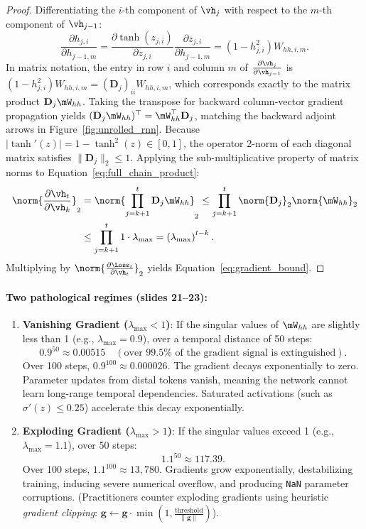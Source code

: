 \documentclass[../../main.tex]{subfiles}
\begin{document}
\begin{proof}
Differentiating the $i$-th component of $\vh_j$ with respect to the $m$-th component of $\vh_{j-1}$:
\[
\frac{\partial h_{j, i}}{\partial h_{j-1, m}} = \frac{\partial \tanh(z_{j, i})}{\partial z_{j, i}} \frac{\partial z_{j, i}}{\partial h_{j-1, m}} = (1 - h_{j, i}^2) W_{hh, i, m}.
\]
In matrix notation, the entry in row $i$ and column $m$ of $\frac{\partial \vh_j}{\partial \vh_{j-1}}$ is $(1 - h_{j, i}^2) W_{hh, i, m} = (\mathbf{D}_j)_{ii} W_{hh, i, m}$, which corresponds exactly to the matrix product $\mathbf{D}_j \mW_{hh}$.
Taking the transpose for backward column-vector gradient propagation yields $(\mathbf{D}_j \mW_{hh})^\top = \mW_{hh}^\top \mathbf{D}_j$, matching the backward adjoint arrows in Figure~\ref{fig:unrolled_rnn}.
Because $|\tanh'(z)| = 1 - \tanh^2(z) \in [0, 1]$, the operator 2-norm of each diagonal matrix satisfies $\|\mathbf{D}_j\|_2 \le 1$. Applying the sub-multiplicative property of matrix norms to Equation~\eqref{eq:full_chain_product}:
\begin{align*}
\norm{\frac{\partial \vh_t}{\partial \vh_k}}_2 &= \norm{\prod_{j=k+1}^t \mathbf{D}_j \mW_{hh}}_2 \le \prod_{j=k+1}^t \norm{\mathbf{D}_j}_2 \norm{\mW_{hh}}_2 \\
&\le \prod_{j=k+1}^t 1 \cdot \lambda_{\max} = \left( \lambda_{\max} \right)^{t-k}.
\end{align*}
Multiplying by $\norm{\frac{\partial \Loss_t}{\partial \vh_t}}_2$ yields Equation~\eqref{eq:gradient_bound}.
\end{proof}

\paragraph{Two pathological regimes (slides 21--23):}
\begin{enumerate}
    \item \textbf{Vanishing Gradient ($\lambda_{\max} < 1$)}: If the singular values of $\mW_{hh}$ are slightly less than 1 (e.g., $\lambda_{\max} = 0.9$), over a temporal distance of 50 steps:
    \[
    0.9^{50} \approx 0.00515 \quad (\text{over } 99.5\% \text{ of the gradient signal is extinguished}).
    \]
    Over 100 steps, $0.9^{100} \approx 0.000026$. The gradient decays exponentially to zero. Parameter updates from distal tokens vanish, meaning the network cannot learn long-range temporal dependencies. Saturated activations (such as $\sigma'(z) \le 0.25$) accelerate this decay exponentially.
    \item \textbf{Exploding Gradient ($\lambda_{\max} > 1$)}: If the singular values exceed 1 (e.g., $\lambda_{\max} = 1.1$), over 50 steps:
    \[
    1.1^{50} \approx 117.39.
    \]
    Over 100 steps, $1.1^{100} \approx 13{,}780$. Gradients grow exponentially, destabilizing training, inducing severe numerical overflow, and producing \texttt{NaN} parameter corruptions. (Practitioners counter exploding gradients using heuristic \emph{gradient clipping}: $\mathbf{g} \leftarrow \mathbf{g} \cdot \min(1, \frac{\text{threshold}}{\|\mathbf{g}\|})$).
\end{enumerate}
\end{document}
